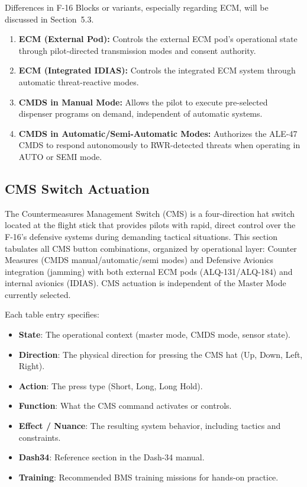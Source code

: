 \documentclass[11pt,a4paper]{article}
\begin{document}
Differences in F-16 Blocks or variants, especially regarding ECM, will be discussed in Section~5.3.

\begin{enumerate}
  \item \textbf{ECM (External Pod):} Controls the external ECM pod's operational state through pilot-directed transmission modes and consent authority.
  \item \textbf{ECM (Integrated IDIAS):} Controls the integrated ECM system through automatic threat-reactive modes.
  \item \textbf{CMDS in Manual Mode:} Allows the pilot to execute pre-selected dispenser programs on demand, independent of automatic systems.
  \item \textbf{CMDS in Automatic/Semi-Automatic Modes:} Authorizes the ALE-47 CMDS to respond autonomously to RWR-detected threats when operating in AUTO or SEMI mode.
\end{enumerate}

\subsection{CMS Switch Actuation}\label{sec:C5-S2}

The Countermeasures Management Switch (CMS) is a four-direction hat switch located at the flight stick that provides pilots with rapid, direct control over the F-16's defensive systems during demanding tactical situations. This section tabulates all CMS button combinations, organized by operational layer: Counter Measures (CMDS manual/automatic/semi modes) and Defensive Avionics integration (jamming) with both external ECM pods (ALQ-131/ALQ-184) and internal avionics (IDIAS). CMS actuation is independent of the Master Mode currently selected.

Each table entry specifies:

\begin{itemize}
  \item \textbf{State}: The operational context (master mode, CMDS mode, sensor state).
  \item \textbf{Direction}: The physical direction for pressing the CMS hat (Up, Down, Left, Right).
  \item \textbf{Action}: The press type (Short, Long, Long Hold).
  \item \textbf{Function}: What the CMS command activates or controls.
  \item \textbf{Effect / Nuance}: The resulting system behavior, including tactics and constraints.
  \item \textbf{Dash34}: Reference section in the Dash-34 manual.
  \item \textbf{Training}: Recommended BMS training missions for hands-on practice.
\end{itemize}
\end{document}

